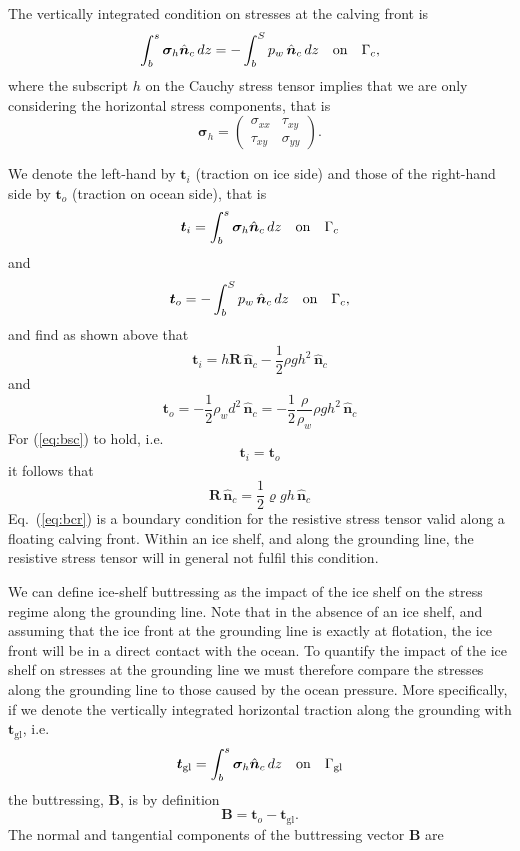 \documentclass[10pt,a4paper]{book}
\newcommand{\txy}{\tau_{xy}}
\newcommand{\sxx}{\sigma_{xx}}
\newcommand{\syy}{\sigma_{yy}}
\newcommand{\normalc}{\hat{\bm{n}}_{c}}
\newcommand{\tgl}{\bm{t}_{\mathrm{gl}}}
\newcommand{\tO}{\bm{t}_o}
\begin{document}
The vertically integrated condition on stresses at the calving front is
\begin{equation}
\int_b^s \bm{\sigma}_h  \normalc \, dz = - \int_b^S p_w \, \normalc  \, dz \quad \hbox{on} \quad \Gamma_c ,
\label{eq:bsc}
\end{equation}
where the subscript $h$ on the Cauchy stress tensor implies that we
are only considering the horizontal stress components, that is
\begin{equation}
\bm{\sigma}_h=\begin{pmatrix}  \sxx & \txy \\ \txy & \syy  \end{pmatrix}.
\label{eq:sh}
\end{equation}



We denote the left-hand by $\bm{t}_i$ (traction on ice side) and
those of the right-hand side by $\bm{t}_o$ (traction on ocean side), that is
\[
\bm{t}_i=\int_b^s \bm{\sigma}_h  \normalc \, dz \quad \hbox{on} \quad \Gamma_c
\]
and
\[
\bm{t}_o= - \int_b^S p_w \, \normalc  \, dz \quad \hbox{on} \quad \Gamma_c ,
\]
and find as shown above that
\[
\bm{t}_i=h \bm{R} \, \normalc - \frac{1}{2} \rho g h^2 \, \normalc
\]
and
\[
 \bm{t}_o= -\frac{1}{2} \rho_w d^2 \, \normalc= - \frac{1}{2} \frac{\rho}{\rho_w} \rho g h^2 \, \normalc
\]
For (\ref{eq:bsc}) to hold, i.e.\
\[
\bm{t}_i=\bm{t}_o
\]
it follows that
\begin{equation}
 \bm{R} \, \normalc =\frac{1}{2} \varrho g h \, \normalc
 \label{eq:bcr}
 \end{equation}
Eq.~(\ref{eq:bcr}) is a boundary condition for the resistive stress
tensor valid along a floating calving front.  Within an ice shelf, and along
the grounding line, the resistive stress tensor will in general not
fulfil this condition.


We can define ice-shelf buttressing as the impact of the ice shelf on
the stress regime along the grounding line. Note that in the absence
of an ice shelf, and assuming that the ice front at the grounding line
is exactly at flotation, the ice front will be in a direct contact
with the ocean.  To quantify the impact of the ice shelf on stresses
at the grounding line we must therefore compare the stresses along the
grounding line to those caused by the ocean pressure.  More
specifically, if we denote the vertically integrated horizontal
traction along the grounding with $\tgl$, i.e.\
\begin{equation}
\tgl=\int_b^s \bm{\sigma}_h  \normalc \, dz \quad \hbox{on} \quad \Gamma_{\mathrm{gl}}
\end{equation}
the buttressing, $\bm{B}$,  is by definition
\begin{equation}
\bm{B}=\tO-\tgl .
\end{equation}
The normal and tangential components of the buttressing vector $\bm{B}$ are
\end{document}
